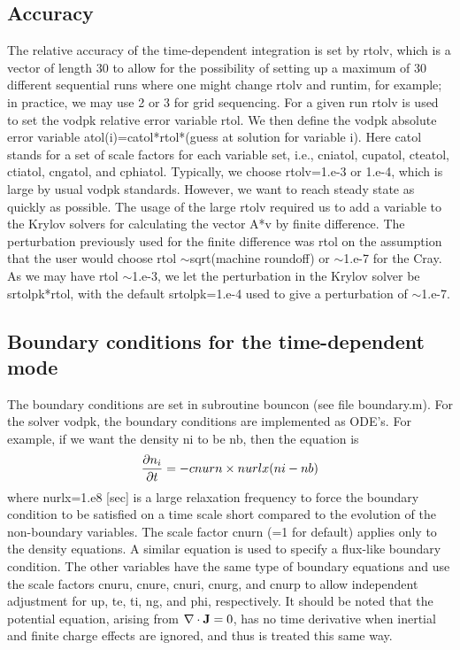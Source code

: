 \documentclass [12pt]{article}
\def\parder#1#2{{\partial#1\over\partial#2}}
\def\tild{$\sim$}
\begin{document}
\subsection{Accuracy}

The relative accuracy of the time-dependent integration is set by rtolv, which
is a vector of length 30 to allow for the possibility of setting up a maximum
of 30 different sequential runs where one might change rtolv and runtim, for
example; in practice, we may use 2 or 3 for grid sequencing.  For a given run
rtolv is used to set the {\sf vodpk} relative error variable {\sf rtol}.  We
then define the {\sf vodpk} absolute error variable {\sf
atol(i)=catol*rtol*(guess at solution for variable i)}.  Here {\sf catol}
stands for a set of scale factors for each variable set, i.e., {\sf cniatol,
cupatol, cteatol, ctiatol, cngatol,} and {\sf cphiatol}.  Typically, we choose
{\sf rtolv}=1.e-3 or 1.e-4, which is large by usual {\sf vodpk} standards.
However, we want to reach steady state as quickly as possible.  The usage of
the large {\sf rtolv} required us to add a variable to the Krylov solvers for
calculating the vector A*v by finite difference.  The perturbation previously
used for the finite difference was rtol on the assumption that the user would
choose {\sf rtol} \tild sqrt(machine roundoff) or \tild 1.e-7 for the Cray.
As we may have {\sf rtol} \tild 1.e-3, we let the perturbation in the Krylov
solver be {\sf srtolpk*rtol}, with the default {\sf srtolpk}=1.e-4 used to
give a perturbation of \tild 1.e-7.

\subsection{Boundary conditions for the time-dependent mode}

The boundary conditions are set in subroutine bouncon (see file boundary.m).
For the solver {\sf vodpk}, the boundary conditions are implemented as ODE's.
For example, if we want the density {\sf ni} to be {\sf nb}, then the equation
is
\begin{equation}
  \label{bndryeq}
  \parder{n_i}{t} = -cnurn\times nurlx (ni - nb)
\end{equation}
where {\sf nurlx}=1.e8 [sec] is a large relaxation frequency to force the
boundary condition to be satisfied on a time scale short compared to the
evolution of the non-boundary variables.  The scale factor {\sf cnurn} (=1 for
default) applies only to the density equations.  A similar equation is used to
specify a flux-like boundary condition.  The other variables have the same
type of boundary equations and use the scale factors {\sf cnuru, cnure, cnuri,
cnurg,} and {\sf cnurp} to allow independent adjustment for up, te, ti, ng,
and phi, respectively.  It should be noted that the potential equation,
arising from $\nabla \cdot {\bf J}=0$, has no time derivative when inertial
and finite charge effects are ignored, and thus is treated this same way.
\end{document}
